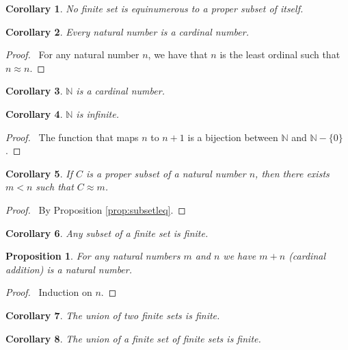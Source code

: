 \documentclass{book}
\let\qed\relax
\newtheorem{prop}[ax]{Proposition}
\newtheorem{cor}{Corollary}[ax]
\theoremstyle{definition}
\begin{document}
\begin{cor}
No finite set is equinumerous to a proper subset of itself.
\end{cor}

\begin{cor}
Every natural number is a cardinal number.
\end{cor}

\begin{proof}
\pf\ For any natural number $n$, we have that $n$ is the least ordinal such that $n \approx n$. \qed
\end{proof}

\begin{cor}
$\mathbb{N}$ is a cardinal number.
\end{cor}

\begin{cor}
$\mathbb{N}$ is infinite.
\end{cor}

\begin{proof}
\pf\ The function that maps $n$ to $n+1$ is a bijection between $\mathbb{N}$ and $\mathbb{N} - \{0\}$. \qed
\end{proof}

\begin{cor}
If $C$ is a proper subset of a natural number $n$, then there exists $m < n$ such that $C \approx m$.
\end{cor}

\begin{proof}
\pf\ By Proposition \ref{prop:subsetleq}. \qed
\end{proof}

\begin{cor}
Any subset of a finite set is finite.
\end{cor}

\begin{prop}
For any natural numbers $m$ and $n$ we have $m+n$ (cardinal addition) is a natural number.
\end{prop}

\begin{proof}
\pf\ Induction on $n$. \qed
\end{proof}

\begin{cor}
The union of two finite sets is finite.
\end{cor}

\begin{cor}
\label{cor:finiteunion}
The union of a finite set of finite sets is finite.
\end{cor}
\end{document}
